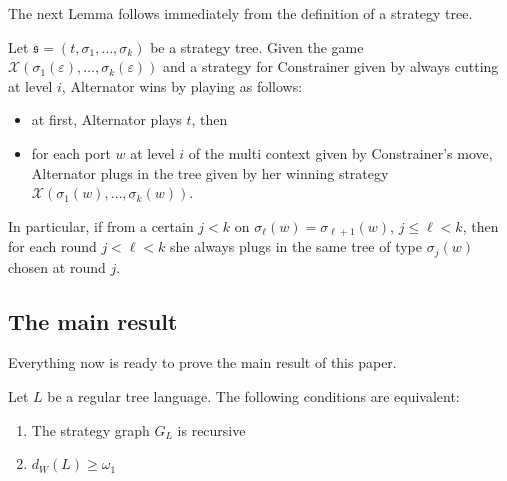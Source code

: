  The next Lemma  follows immediately from the definition of a strategy tree.
\begin{lemma}\label{lemma:short_strategy}
Let $\mathfrak{s}=(t, \sigma_1, \dots, \sigma_k)$ be a strategy tree. Given the  game $\mathcal{X}(\sigma_1(\varepsilon), \dots, \sigma_k(\varepsilon))$ and a strategy for Constrainer given by always cutting at level $i$, Alternator wins  by playing as follows:
\begin{itemize}
\item at first, Alternator plays $t$, then
\item for each port $w$ at level $i$ of the multi context given by Constrainer's move, Alternator plugs in the tree given by her winning strategy $\mathcal{X}(\sigma_1(w), \dots, \sigma_k(w))$.
\end{itemize}
In particular, if from a certain $j<k$ on $\sigma_\ell(w)=\sigma_{\ell+1}(w)$, $j\leq \ell < k$, then for each round $j< \ell < k$ she always plugs in the same tree of type $\sigma_j(w)$ chosen at round $j$.
\end{lemma}






\subsection{The main result}
Everything now is ready to prove the main result of this paper.
\begin{theorem}\label{theorem:main}
Let $L$ be a regular tree language. The following conditions are equivalent:
\begin{enumerate}
\item The strategy graph $G_L$ is recursive
\item $d_W(L) \geq \omega_1$
\end{enumerate}
\end{theorem}

